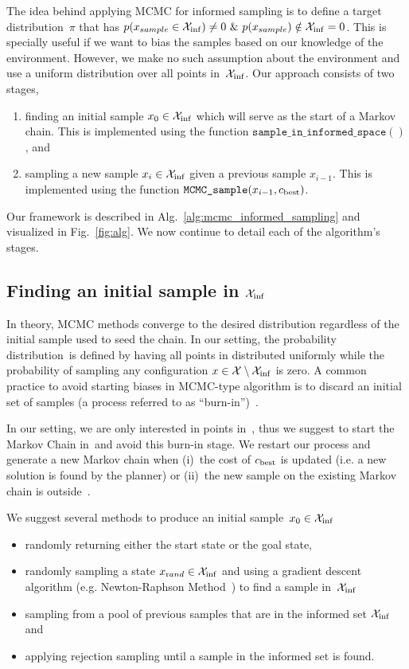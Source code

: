 \documentclass[letterpaper, 10 pt, conference]{ieeeconf}  %
\begin{document}
The idea behind applying MCMC for informed sampling is to define a target distribution~$ \pi $ that has $p(x_{sample}\in\mathcal{X}_{\rm {inf}}) \ne 0 ~\&~ p(x_{sample})\notin\mathcal{X}_{\rm {inf}} = 0$. 
This is specially useful if we want to bias the samples based on our knowledge of the environment.
However, we make no such assumption about the environment and use a uniform distribution over all points in~$ \mathcal{X}_{\rm {inf}} $. 
Our approach consists of two stages,
\begin{enumerate}
	\item finding an initial sample $ x_0 \in \mathcal{X}_{\rm {inf}} $ which will serve as the start of a Markov chain. 
	This is implemented using the function 
	$ \texttt{sample\_in\_informed\_space}( )$, and
	\item sampling a new sample $ x_i \in \mathcal{X}_{\rm {inf}} $ given a previous sample $ x_{i-1} $. 
	This is implemented using the function $\texttt{MCMC\_sample} (x_{i-1}, c_{\rm best})$.
\end{enumerate}
Our framework is described in Alg.~\ref{alg:mcmc_informed_sampling} and visualized in Fig.~\ref{fig:alg}.
We now continue to detail each of the algorithm's stages.

\subsection{Finding an initial sample in $\mathcal{X}_{\rm {inf}}$}
In theory, MCMC methods converge to the desired distribution regardless of the initial sample used to seed the chain.
In our setting, the probability distribution~\Pinf is defined by having all points in \Cinf distributed uniformly
while 
the probability of sampling any configuration $x \in \mathcal{X} \setminus \mathcal{X}_{\rm {inf}}$ is zero.
A common practice to avoid starting biases in MCMC-type algorithm is to discard an initial set of samples (a process referred to as ``burn-in'')~\cite{ADDJ03}. 

In our setting, we are only interested in points in~\Cinf, thus we suggest to start the Markov Chain in~\Cinf and avoid this burn-in stage. 
We restart our process and generate a new Markov chain  when 
(i)~the cost of $c_{\rm best}$ is updated (i.e. a new solution is found by the planner) or
(ii)~the new sample on the existing Markov chain is outside~\Cinf.

We suggest several methods to produce an initial sample~$x_0 \in \mathcal{X}_{\rm {inf}} $ 
\begin{itemize}
	\item randomly returning either the start state or the goal state,
	\item randomly sampling a state $x_{\text rand} \in \mathcal{X}_{\rm {inf}}$ and using a gradient descent algorithm (e.g. Newton-Raphson Method~\cite{RT06}) to find a sample in~$ \mathcal{X}_{\rm {inf}} $
	\item sampling from a pool of previous samples that are in the informed set $ \mathcal{X}_{\rm {inf}} $ and
	\item applying rejection sampling until a sample in the informed set is found.
\end{itemize}
\end{document}
